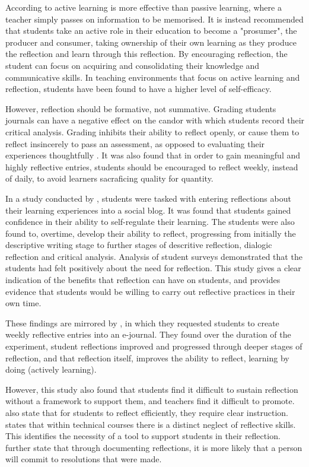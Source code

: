 \documentclass{l4proj}
\begin{document}
According to \citet{bruno_reflective_2018} active learning is more effective than passive learning, where a teacher simply passes on information to be memorised. It is instead recommended that students take an active role in their education to become a "prosumer", the producer and consumer, taking ownership of their own learning as they produce the reflection and learn through this reflection. By encouraging reflection, the student can focus on acquiring and consolidating their knowledge and communicative skills. In teaching environments that focus on active learning and reflection, students have been found to have a higher level of self-efficacy.

However, reflection should be formative, not summative. Grading students journals can have a negative effect on the candor with which students record their critical analysis. Grading inhibits their ability to reflect openly, or cause them to reflect insincerely to pass an assessment, as opposed to evaluating their experiences thoughtfully \citep{bruno_reflective_2018}. It was also found that in order to gain meaningful and highly reflective entries, students should be encouraged to reflect weekly, instead of daily, to avoid learners sacraficing quality for quantity.

In a study conducted by \citet{mcdermott_developing_nodate}, students were tasked with entering reflections about their learning experiences into a social blog. It was found that students gained confidence in their ability to self-regulate their learning. The students were also found to, overtime, develop their ability to reflect, progressing from initially the descriptive writing stage to further stages of descritive reflection, dialogic reflection and critical analysis. Analysis of student surveys demonstrated that the students had felt positively about the need for reflection. This study gives a clear indication of the benefits that reflection can have on students, and provides evidence that students would be willing to carry out reflective practices in their own time.

These findings are mirrored by \citet{bruno_reflective_2018}, in which they requested students to create weekly reflective entries into an e-journal. They found over the duration of the experiment, student reflections improved and progressed through deeper stages of reflection, and that reflection itself, improves the ability to reflect, learning by doing (actively learning). 

However, this study also found that students find it difficult to sustain reflection without a framework to support them, and teachers find it difficult to promote. \citet{bruno_reflective_2018} also state that for students to reflect efficiently, they require clear instruction. \citet{thurner_development_2020} states that within technical courses there is a distinct neglect of reflective skills. This identifies the necessity of a tool to support students in their reflection. \citet{thurner_development_2020} further state that through documenting reflections, it is more likely that a person will commit to resolutions that were made.
\end{document}
